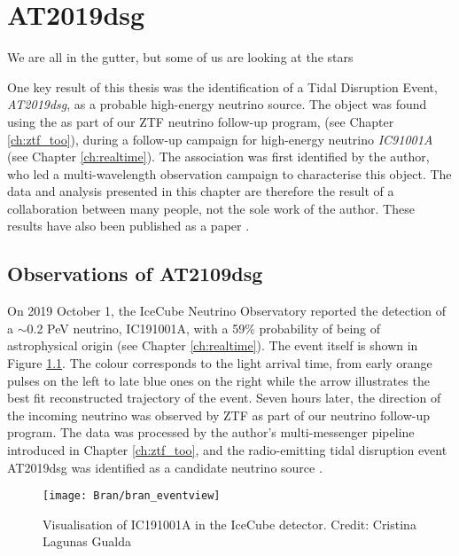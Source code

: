\setchapterpreamble[u]{\margintoc}
\chapter{AT2019dsg}
\begin{fquote}We are all in the gutter, but some of us are looking at the stars
\end{fquote}

One key result of this thesis was the identification of a Tidal Disruption Event, \emph{AT2019dsg}, as a probable high-energy neutrino source. The object was found using the \ztf{} as part of our ZTF neutrino follow-up program, (see Chapter \ref{ch:ztf_too}), during a follow-up campaign for high-energy neutrino \emph{IC91001A} (see Chapter \ref{ch:realtime}). The association was first identified by the author, who led a multi-wavelength observation campaign to characterise this object. The data and analysis presented in this chapter are therefore the result of a collaboration between many people, not the sole work of the author. These results have also been published as a paper .

\section{Observations of AT2109dsg}
\label{sec:bran_obs}

On 2019 October 1, the IceCube Neutrino Observatory reported the detection of a $\sim$0.2 PeV neutrino, IC191001A, with a 59\% probability of being of astrophysical origin  (see Chapter \ref{ch:realtime}). The event itself is shown in Figure \ref{fig:bran_eventview}. The colour corresponds to the light arrival time, from early orange pulses on the left to late blue ones on the right while the arrow illustrates the best fit reconstructed trajectory of the event. Seven hours later, the direction of the incoming neutrino was observed by ZTF as part of our neutrino follow-up program. The data was processed by the author's multi-messenger pipeline introduced in Chapter \ref{ch:ztf_too}, and the radio-emitting tidal disruption event AT2019dsg was identified as a candidate neutrino source . 

\begin{figure}[!ht]
	\texttt{[image: Bran/bran\_eventview]}
	\caption{Visualisation of IC191001A in the IceCube detector. Credit: Cristina Lagunas Gualda}
	\label{fig:bran_eventview}
\end{figure}

